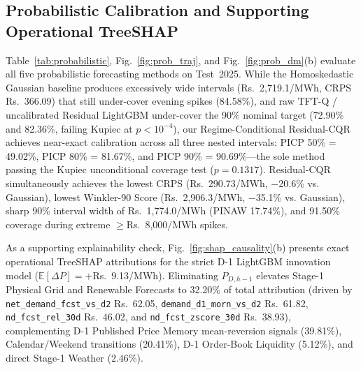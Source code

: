 \documentclass[runningheads,a4paper]{llncs}
\begin{document}
\subsection{Probabilistic Calibration and Supporting Operational TreeSHAP}
Table~\ref{tab:probabilistic}, Fig.~\ref{fig:prob_traj}, and Fig.~\ref{fig:prob_dm}(b) evaluate all five probabilistic forecasting methods on Test~2025. While the Homoskedastic Gaussian baseline produces excessively wide intervals (Rs.~2,719.1/MWh, CRPS Rs.~366.09) that still under-cover evening spikes (84.58\%), and raw TFT-Q / uncalibrated Residual LightGBM under-cover the 90\% nominal target (72.90\% and 82.36\%, failing Kupiec at $p < 10^{-4}$), our Regime-Conditional Residual-CQR achieves near-exact calibration across all three nested intervals: PICP 50\% = 49.02\%, PICP 80\% = 81.67\%, and PICP 90\% = 90.69\%---the sole method passing the Kupiec unconditional coverage test ($p = 0.1317$). Residual-CQR simultaneously achieves the lowest CRPS (Rs.~290.73/MWh, $-$20.6\% vs. Gaussian), lowest Winkler-90 Score (Rs.~2,906.3/MWh, $-$35.1\% vs. Gaussian), sharp 90\% interval width of Rs.~1,774.0/MWh (PINAW 17.74\%), and 91.50\% coverage during extreme $\ge$Rs.~8,000/MWh spikes.

As a supporting explainability check, Fig.~\ref{fig:shap_causality}(b) presents exact operational TreeSHAP attributions for the strict D-1 LightGBM innovation model ($\mathbb{E}[\Delta P] = +$Rs.~9.13/MWh). Eliminating $P_{D,h-1}$ elevates Stage-1 Physical Grid and Renewable Forecasts to 32.20\% of total attribution (driven by \texttt{net\_demand\_fcst\_vs\_d2} Rs.~62.05, \texttt{demand\_d1\_morn\_vs\_d2} Rs.~61.82, \texttt{nd\_fcst\_rel\_30d} Rs.~46.02, and \texttt{nd\_fcst\_zscore\_30d} Rs.~38.93), complementing D-1 Published Price Memory mean-reversion signals (39.81\%), Calendar/Weekend transitions (20.41\%), D-1 Order-Book Liquidity (5.12\%), and direct Stage-1 Weather (2.46\%).
\end{document}
